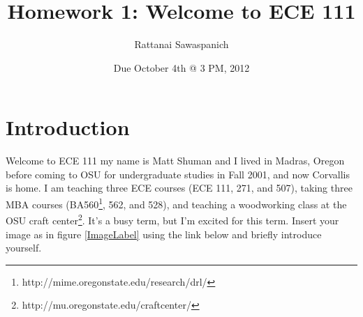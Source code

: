 \documentclass{article}
\title{Homework 1: Welcome to ECE 111}
\author{Rattanai Sawaspanich}
\date{Due October 4th @ 3 PM, 2012}
\begin{document}
 
\maketitle

\section{Introduction}
Welcome to ECE 111 my name is Matt Shuman and I lived in Madras, Oregon before coming to OSU for undergraduate studies in Fall 2001, and now Corvallis is home.  I am teaching three ECE courses (ECE 111, 271, and 507), taking three MBA courses (BA560\footnote{http://mime.oregonstate.edu/research/drl/}, 562, and 528), and teaching a woodworking class at the OSU craft center\footnote{http://mu.oregonstate.edu/craftcenter/}.  It's a busy term, but I'm excited for this term. Insert your image as in figure \ref{ImageLabel} using the link below and briefly introduce yourself.
\newline

\newpage
{}
\end{document}
